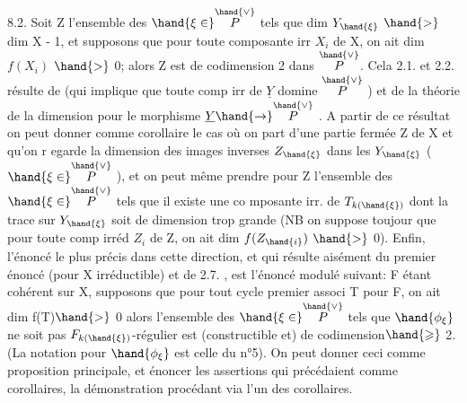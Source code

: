 
8.2. Soit Z l'ensemble des $\hand{\xi\in}\overset{\hand{\vee}}{P}$ tels que dim $Y_{\hand{\xi}}$ $\hand{>}$ dim X - 1,\hand{\unsure{\xi}}
et supposons que pour toute composante irr $X_i$ de X, on ait dim $f(X_i)$ $\hand{>}$ 0;
alors Z est de codimension 2 dans $\overset{\hand{\vee}}{P}$.  Cela
2.1. et 2.2.
résulte de 
 (qui implique que toute comp irr de $\underline{Y}$ domine $\overset{\hand{\vee}}{P}$ ) et de
la théorie de la dimension pour le morphisme $\underline{Y} \hand{\to} \overset{\hand{\vee}}{P}$ . A partir de ce
résultat  on peut donner comme corollaire le cas où on
part d'une partie fermée  Z de X et qu'on r egarde la dimension des
images inverses $Z_{\hand{\xi}}$ dans les $Y_{\hand{\xi}}$ ( $\hand{\xi\in}\overset{\hand{\vee}}{P}$ ), et on peut même prendre pour
Z l'ensemble des $\hand{\xi\in}\overset{\hand{\vee}}{P}$ tels que il existe une co mposante irr. de $T_{k(\hand{\xi})}$
dont la trace sur $Y_{\hand{\xi}}$ soit de dimension trop grande (NB on suppose toujour
que pour toute comp irréd $Z_i$ de Z, on ait dim $f(Z_{\hand{i}})$ $\hand{>}$ 0). Enfin, l'énoncé
le plus précis dans cette direction, et qui résulte aisément du premier
énoncé (pour X irréductible) et de 2.7. , est l'énoncé modulé suivant:
F étant cohérent sur X,  supposons que pour tout cycle premier associ
T pour F, on ait dim f(T)$\hand{>}$ 0\unsure{;|,} alors l'ensemble des $\hand{\xi\in}\overset{\hand{\vee}}{P}$ tels que
$\hand{\phi_\xi}$ ne soit pas $F_{k(\hand{\xi})}$-régulier est (constructible et) de codimension$\hand{\geqslant}$ 2.
\placedmargin{\textbar} (La notation pour $\hand{\phi_\xi}$ est celle du n°5). On peut donner ceci comme
\placedmargin{\textbar} proposition principale, et énoncer les  assertions qui précédaient
\placedmargin{\textbar} comme corollaires, la démonstration procédant via l'un des corollaires.



